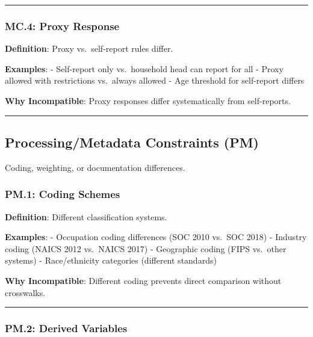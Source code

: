 \documentclass[
  letterpaper,
]{report}
\begin{document}
\begin{center}\rule{0.5\linewidth}{0.5pt}\end{center}

\subsubsection{MC.4: Proxy Response}\label{mc.4-proxy-response}

\textbf{Definition}: Proxy vs.~self-report rules differ.

\textbf{Examples}: - Self-report only vs.~household head can report for
all - Proxy allowed with restrictions vs.~always allowed - Age threshold
for self-report differs

\textbf{Why Incompatible}: Proxy responses differ systematically from
self-reports.

\begin{center}\rule{0.5\linewidth}{0.5pt}\end{center}

\subsection{Processing/Metadata Constraints
(PM)}\label{processingmetadata-constraints-pm}

Coding, weighting, or documentation differences.

\subsubsection{PM.1: Coding Schemes}\label{pm.1-coding-schemes}

\textbf{Definition}: Different classification systems.

\textbf{Examples}: - Occupation coding differences (SOC 2010 vs.~SOC
2018) - Industry coding (NAICS 2012 vs.~NAICS 2017) - Geographic coding
(FIPS vs.~other systems) - Race/ethnicity categories (different
standards)

\textbf{Why Incompatible}: Different coding prevents direct comparison
without crosswalks.

\begin{center}\rule{0.5\linewidth}{0.5pt}\end{center}

\subsubsection{PM.2: Derived Variables}\label{pm.2-derived-variables}
\end{document}
